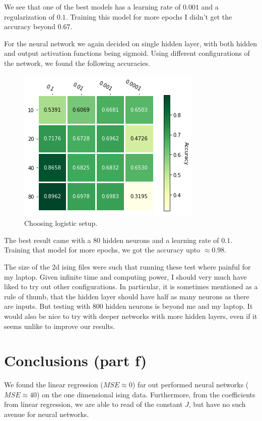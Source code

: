 \documentclass[parskip=half]{scrartcl}
\theoremstyle{definition}
\theoremstyle{remark}
\begin{document}
We see that one of the best models has a learning rate of $0.001$ and a regularization of $0.1$. 
Training this model for more epochs I didn't get the accuracy beyond $0.67$. 

For the neural network we again decided on single hidden layer, with both hidden and output activation functions being sigmoid. 
Using different configurations of the network, we found the following accuracies. 

\begin{figure}[H]
\caption{Choosing logistic setup.}
\centering
\includegraphics[scale=0.6]{2dnet.png}
\end{figure}

The best result came with a $80$ hidden neurons and a learning rate of $0.1$. 
Training that model for more epochs, we got the accuracy upto $\approx 0.98$.

The size of the 2d ising files were such that running these test where painful for my laptop. 
Given infinite time and computing power, I should very much have liked to try out other configurations. 
In particular, it is sometimes mentioned as a rule of thumb, that the hidden layer should have half as many neurons as there are inputs. 
But testing with 800 hidden neurons is beyond me and my laptop. 
It would also be nice to try with deeper networks with more hidden layers, even if it seems unlike to improve our results.   

\section{Conclusions (part f)} \label{sec:conclusion}

We found the linear regression ($MSE \approx 0$) far out performed neural networks ($MSE \approx 40$) on the one dimensional ising data. 
Furthermore, from the coefficients from linear regression, we are able to read of the constant $J$, but have no such avenue for neural networks. 
\end{document}
